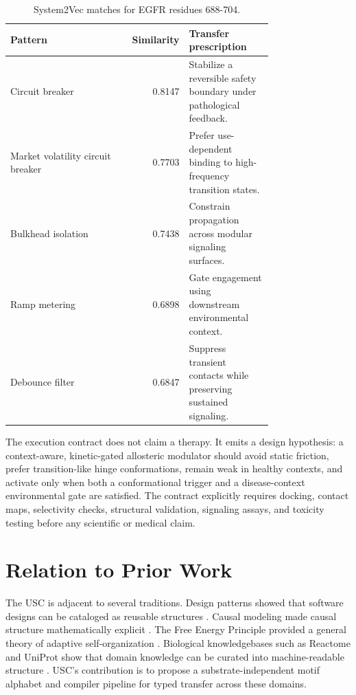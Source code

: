 \documentclass[11pt]{article}
\begin{document}
\begin{table}[h]
\centering
\caption{System2Vec matches for EGFR residues 688-704.}
\small
\begin{tabular}{L{0.44\linewidth}rL{0.32\linewidth}}
\toprule
Pattern & Similarity & Transfer prescription \\
\midrule
Circuit breaker & 0.8147 & Stabilize a reversible safety boundary under pathological feedback. \\
Market volatility circuit breaker & 0.7703 & Prefer use-dependent binding to high-frequency transition states. \\
Bulkhead isolation & 0.7438 & Constrain propagation across modular signaling surfaces. \\
Ramp metering & 0.6898 & Gate engagement using downstream environmental context. \\
Debounce filter & 0.6847 & Suppress transient contacts while preserving sustained signaling. \\
\bottomrule
\end{tabular}
\end{table}

The execution contract does not claim a therapy. It emits a design hypothesis:
a context-aware, kinetic-gated allosteric modulator should avoid static
friction, prefer transition-like hinge conformations, remain weak in healthy
contexts, and activate only when both a conformational trigger and a
disease-context environmental gate are satisfied. The contract explicitly
requires docking, contact maps, selectivity checks, structural validation,
signaling assays, and toxicity testing before any scientific or medical claim.

\section{Relation to Prior Work}

The USC is adjacent to several traditions. Design patterns showed that
software designs can be cataloged as reusable structures \cite{gamma1994}.
Causal modeling made causal structure mathematically explicit \cite{pearl2009}.
The Free Energy Principle provided a general theory of adaptive
self-organization \cite{friston2010}. Biological knowledgebases such as
Reactome and UniProt show that domain knowledge can be curated into
machine-readable structure \cite{reactome2024,uniprot2023}. USC's contribution
is to propose a substrate-independent motif alphabet and compiler pipeline for
typed transfer across these domains.
\end{document}
